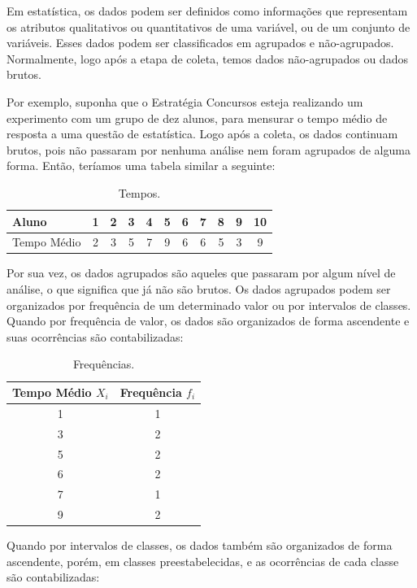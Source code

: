 Em estatística, os dados podem ser definidos como informações que representam os atributos qualitativos ou quantitativos de uma variável, ou de um conjunto de variáveis. Esses dados podem ser classificados em agrupados e não-agrupados. Normalmente, logo após a etapa de coleta, temos dados
não-agrupados ou dados brutos.

Por exemplo, suponha que o Estratégia Concursos esteja realizando um experimento com um grupo de dez alunos, para mensurar o tempo médio de resposta a uma questão de estatística. Logo após a coleta, os dados continuam brutos, pois não passaram por nenhuma análise nem foram agrupados de alguma forma. Então, teríamos uma tabela similar a seguinte:

\begin{table}[H]
    \centering
\begin{tabular}{lcccccccccc}
\toprule
Aluno       &1&2&3&4&5&6&7&8&9&10\\
\midrule
Tempo Médio &2&3&5&7&9&6&6&5&3&9\\
\bottomrule
\end{tabular}
\caption{Tempos.}
\end{table}

Por sua vez, os dados agrupados são aqueles que passaram por algum nível de análise, o que significa que já não são brutos. Os dados agrupados podem ser organizados por frequência de um determinado valor ou por intervalos de classes. Quando por frequência de valor, os dados são organizados de forma ascendente e suas ocorrências são contabilizadas:

\begin{table}[H]
    \centering
\begin{tabular}{cc}
\toprule
\shortstack{Tempo \\Médio \(X_i\)} &Frequência \(f_i\)\\
\midrule
1      &1\\
3      &2\\
5      &2\\
6      &2\\
7      &1\\
9      &2\\
\bottomrule
\end{tabular}
\caption{Frequências.}
\end{table}

Quando por intervalos de classes, os dados também são organizados de forma ascendente, porém, em classes preestabelecidas, e as ocorrências de cada classe são contabilizadas:

